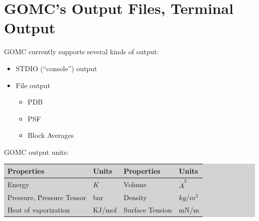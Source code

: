 \section{GOMC's Output Files, Terminal Output}
GOMC currently supports several kinds of output:
\begin{itemize}
\item STDIO (``console'') output
\item File output
	\begin{itemize}
	\item PDB
	\item PSF
	\item Block Averages
	\end{itemize}
\end{itemize}
GOMC output units:\\
\colorbox{lightgray}{
\begin{tabular}{ll | ll}
\hline
Properties & Units & Properties & Units \\
\hline
Energy & $K$ & Volume & $\mathring{A}^3$ \\
Pressure, Pressure Tensor & bar & Density & $kg/m^3$ \\
Heat of vaporization & KJ/mol & Surface Tension & mN/m \\
\end{tabular}}
